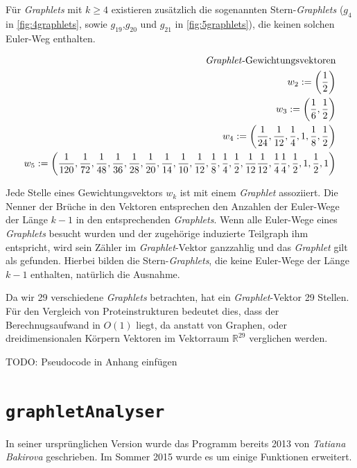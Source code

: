 \documentclass{report}
\begin{document}
F\"ur \textit{Graphlets} mit $k \geq 4$ existieren zus\"atzlich die sogenannten Stern-\textit{Graphlets} ($g_4$ in \ref{fig:4graphlets}, sowie $g_{19}$,$g_{20}$ und $g_{21}$ in \ref{fig:5graphlets}), die keinen solchen Euler-Weg enthalten.

\begin{subequations}
\label{eq:w-vector}
\begin{align}
\text{\textit{Graphlet}-Gewichtungsvektoren} \\
w_2 := \left( \frac{1}{2} \right) \\
w_3 := \left( \frac{1}{6}, \frac{1}{2} \right) \\
w_4 := \left( \frac{1}{24}, \frac{1}{12}, \frac{1}{4}, 1, \frac{1}{8},\frac{1}{2} \right) \\
w_5 := \left( \frac{1}{120}, \frac{1}{72}, \frac{1}{48}, \frac{1}{36}, \frac{1}{28}, \frac{1}{20}, \frac{1}{14}, \frac{1}{10}, \frac{1}{12}, \frac{1}{8}, \frac{1}{4}, \frac{1}{2}, \frac{1}{12} \frac{1}{12}, \frac{1}{4} \frac{1}{4}, \frac{1}{2}, 1, \frac{1}{2}, 1\right)
\end{align}
\end{subequations}

Jede Stelle eines Gewichtungsvektors $w_k$ ist mit einem \textit{Graphlet} assoziiert. Die Nenner der Br\"uche in den Vektoren entsprechen den Anzahlen der Euler-Wege der L\"ange $k-1$ in den entsprechenden \textit{Graphlets}. Wenn alle Euler-Wege eines \textit{Graphlets} besucht wurden und der zugeh\"orige induzierte Teilgraph ihm entspricht, wird sein Z\"ahler im \textit{Graphlet}-Vektor ganzzahlig und das \textit{Graphlet} gilt als gefunden.
Hierbei bilden  die Stern-\textit{Graphlets}, die keine Euler-Wege der L\"ange $k-1$ enthalten, nat\"urlich die Ausnahme.
 
Da wir 29 verschiedene \textit{Graphlets} betrachten, hat ein \textit{Graphlet}-Vektor 29 Stellen. F\"ur den Vergleich von Proteinstrukturen bedeutet dies, dass der Berechnugsaufwand in $O(1)$ liegt, da anstatt von Graphen, oder dreidimensionalen K\"orpern Vektoren im Vektorraum $\mathbb{R}^{29}$ verglichen werden.

TODO: Pseudocode in Anhang einf\"ugen


\section{\texttt{graphletAnalyser}}

In seiner urspr\"unglichen Version wurde das Programm bereits 2013 von \textit{Tatiana Bakirova} geschrieben. Im Sommer 2015 wurde es um einige Funktionen erweitert.
\end{document}
